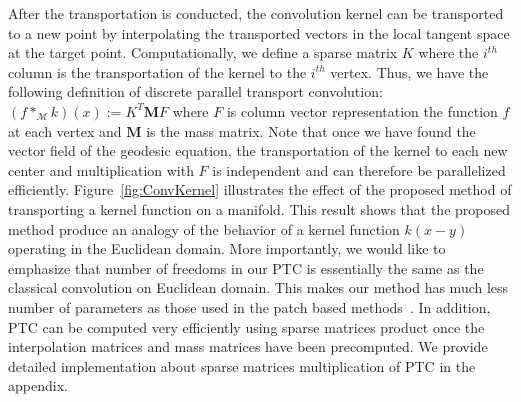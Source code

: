 \documentclass[10pt,twocolumn,letterpaper]{article}
\def\M{\mathcal{M}}
\begin{document}
After the transportation is conducted, the convolution kernel can be transported to a new point by interpolating the transported vectors in the local tangent space at the target point.
Computationally, we define a sparse matrix $K$ where the $i^{th}$ column is the transportation of the kernel to the $i^{th}$ vertex. Thus, we have the following definition of discrete parallel transport convolution:
%
$(f *_{\M} k) (x) :=  K^T \textbf{M} F$
%
where $F$ is column vector representation the function $f$ at each vertex and $\textbf{M}$ is the mass matrix. Note that once we have found the vector field of the geodesic equation, the transportation of the kernel to each new center and multiplication with $F$ is independent and can therefore be parallelized efficiently. 
Figure~\ref{fig:ConvKernel} illustrates the effect of the proposed method of transporting a kernel function on a manifold. This result shows that the proposed method produce an analogy of the behavior of a kernel function $k(x-y)$ operating in the Euclidean domain. More importantly, we would like to emphasize that number of freedoms in our PTC is essentially the same as the classical convolution on Euclidean domain. This makes our method has much less number of parameters as those used in the patch based methods~\cite{masci2015geodesic}. In addition, PTC can be computed very efficiently using sparse matrices product once the interpolation matrices and mass matrices have been precomputed. We provide detailed implementation about sparse matrices multiplication of PTC in the appendix. 
\end{document}
